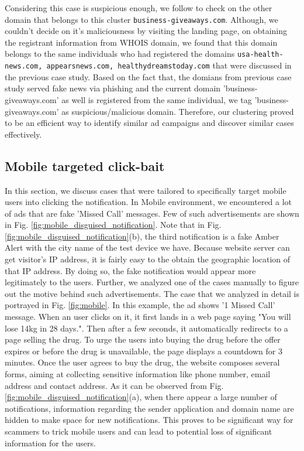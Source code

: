 Considering this case is suspicious enough, we follow to check on the other domain that belongs to this cluster \texttt{business-giveaways.com}. Although, we couldn't decide on it's maliciousness by visiting the landing page, on obtaining the registrant information from WHOIS domain, we found that this domain belongs to the same individuals who had registered the domains \texttt{usa-health-news.com, appearsnews.com, healthydreamstoday.com} that were discussed in the previous case study. Based on the fact that, the domians from previous case study served fake news via phishing and the current domain 'business-giveaways.com' as well is registered from the same individual, we tag 'business-giveaways.com' as suspicious/malicious domain. Therefore, our clustering proved to be an efficient way to identify similar ad campaigns and discover similar cases effectively.


\subsection{Mobile targeted click-bait}
In this section, we discuss cases that were tailored to specifically target mobile users into clicking the notification. In Mobile environment, we encountered a lot of ads that are fake 'Missed Call' messages. Few of such advertisements are shown in Fig. \ref{fig:mobile_disguised_notification}. Note that in Fig. \ref{fig:mobile_disguised_notification}(b), the third notification is a fake Amber Alert with the city name of the test device we have. Because website server can get visitor's IP address, it is fairly easy to the obtain the geographic location of that IP address. By doing so, the fake notification would appear more legitimately to the users. Further, we analyzed one of the cases manually to figure out the motive behind such advertisements. The case that we analyzed in detail is portrayed in Fig. \ref{fig:mobile}. In this example, the ad shows '1 Missed Call' message. When an user clicks on it, it first lands in a web page saying "You will lose 14kg in 28 days.". Then after a few seconds, it automatically redirects to a page selling the drug. To urge the users into buying the drug before the offer expires or before the drug is unavailable, the page displays a countdown for 3 minutes. Once the user agrees to buy the drug, the website composes several forms, aiming at collecting sensitive information like phone number, email address and contact address. As it can be observed from Fig. \ref{fig:mobile_disguised_notification}(a), when there appear a large number of notifications, information regarding the sender application and domain name are hidden to make space for new notifications. This proves to be significant way for scammers to trick mobile users and can lead to potential loss of significant information for the users.

